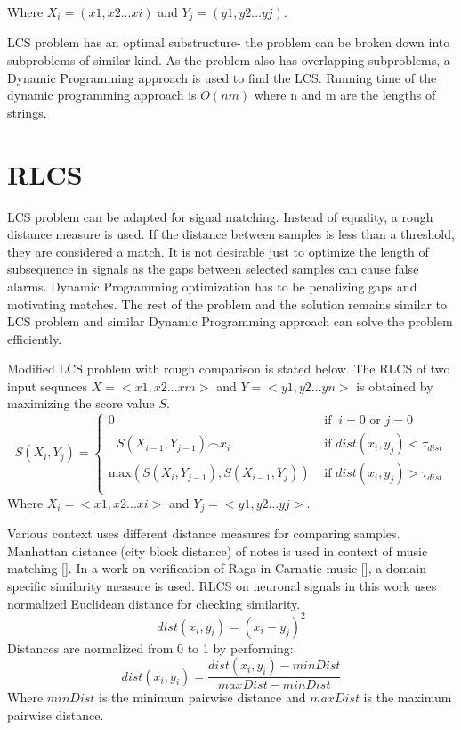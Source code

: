 \documentclass[MTech]{iitmdiss}
\begin{document}
Where $X_i = (x1, x2...xi)$ and $Y_j = (y1, y2...yj)$.

LCS problem has an optimal substructure- the problem can be broken down into subproblems of similar kind. As the problem also has overlapping subproblems, a Dynamic Programming approach is used to find the LCS. Running time of the dynamic programming approach is  $O(nm)$ where n and m are the lengths of strings.

\section{RLCS} %
\label{sec:rlcs}
LCS problem can be adapted for signal matching. Instead of equality, a rough distance measure is used. If the distance between samples is less than a threshold, they are considered a match. It is not desirable just to optimize the length of subsequence in signals as the gaps between selected samples can cause false alarms. Dynamic Programming optimization has to be penalizing gaps and motivating matches. The rest of the problem and the solution remains similar to LCS problem and similar Dynamic Programming approach can solve the problem efficiently.

Modified LCS problem with rough comparison is stated below. The RLCS of two input sequnces $X = <x1, x2...xm>$ and $Y = <y1, y2...yn>$ is obtained by maximizing the score value $S$.
$$
S\left(X_{i},Y_{j}\right) =
\begin{cases}
  0
& \mbox{ if }\ i = 0 \mbox{ or }  j = 0 \\
  \textrm{  } S\left(X_{i-1},Y_{j-1}\right) \frown x_{i}
& \mbox{ if } dist(x_i , y_j) < \tau_{dist} \\
  \mbox{max}\left(S\left(X_{i},Y_{j-1}\right),S\left(X_{i-1},Y_{j}\right)\right)
& \mbox{ if } dist(x_i , y_j) > \tau_{dist} \\
\end{cases}
$$
Where $X_i = <x1, x2...xi>$ and $Y_j = <y1, y2...yj>$.

Various context uses different distance measures for comparing samples.  Manhattan distance (city block distance) of notes is used in context of music matching [\cite{lin2011music}]. In a work on verification of Raga in Carnatic music [\cite{duttaraga}], a domain specific similarity measure is used. RLCS on neuronal signals in this work uses normalized Euclidean distance for checking similarity.
$$dist(x_i, y_i) = (x_i - y_j)^2$$
Distances are normalized from 0 to 1 by performing: 
$$dist(x_i, y_i) = \frac{dist(x_i, y_i) - minDist}{maxDist - minDist}$$
Where $minDist$ is the minimum pairwise distance and $maxDist$ is the maximum pairwise distance.
\end{document}

